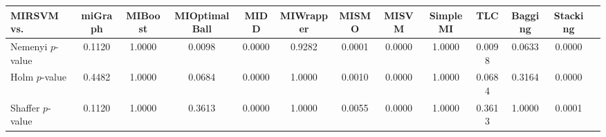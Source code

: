 \begin{threeparttable}
\begin{tabular}{lcccccccccccc}
\toprule
MIRSVM vs. &miGraph &MIBoost &MIOptimalBall &MIDD &MIWrapper &MISMO &MISVM &SimpleMI &TLC &Bagging &Stacking \\
\midrule
Nemenyi $p$-value &0.1120 &1.0000 &0.0098 &0.0000 &0.9282 &0.0001 &0.0000 &1.0000 &0.0098 &0.0633 &0.0000 &  \\
Holm $p$-value &0.4482 &1.0000 &0.0684 &0.0000 &1.0000 &0.0010 &0.0000 &1.0000 &0.0684 &0.3164 &0.0000 &  \\
Shaffer $p$-value &0.1120 &1.0000 &0.3613 &0.0000 &1.0000 &0.0055 &0.0000 &1.0000 &0.3613 &1.0000 &0.0001 &  \\
\bottomrule
\end{tabular}
\end{threeparttable}